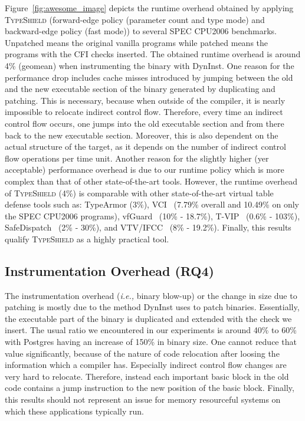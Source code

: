 Figure~\ref{fig:awesome_image} depicts the runtime overhead obtained by applying \textsc{TypeShield} (forward-edge policy (parameter count and type mode) and backward-edge policy (fast mode))
to several SPEC CPU2006 benchmarks. Unpatched means the original vanilla programs while patched means the programs with the CFI checks inserted.
The obtained runtime overhead is around 4\% (geomean) when instrumenting the binary with DynInst. 
One reason for the performance drop includes cache misses introduced by jumping between the old and the new executable section 
of the binary generated by duplicating and patching. This is necessary, because when
outside of the compiler, it is nearly impossible to relocate indirect control flow. Therefore, 
every time an indirect control flow occurs, one jumps into the old executable section and from 
there back to the new executable section. Moreover, this is also dependent on the actual structure 
of the target, as it depends on the number of indirect control flow operations per time unit.
Another reason for the slightly higher (yer acceptable) performance overhead is due to our
runtime policy which is more complex than that of other state-of-the-art tools.
However, the runtime overhead of \textsc{TypeShield} (4\%) is comparable with other state-of-the-art virtual table defense
tools such as: TypeArmor (3\%), VCI~\cite{vci:asiaccs} (7.79\% overall and 10.49\% on only the SPEC CPU2006 programs), vfGuard~\cite{vfuard:aravind} (10\% - 18.7\%), T-VIP~\cite{gawlik} (0.6\% - 103\%), 
SafeDispatch~\cite{safedispatch:jang} (2\% - 30\%), and VTV/IFCC~\cite{vtv:tice} (8\% - 19.2\%).
Finally, this results qualify \textsc{TypeShield} as a highly practical tool.


\subsection{Instrumentation Overhead (RQ4)}
\label{section:typeshieldoverheadinstrumentation}


The instrumentation overhead (\textit{i.e.,} binary blow-up) or the change in size due to patching is mostly due to the method DynInst uses to patch binaries. 
Essentially, the executable part of the binary is duplicated and extended with the check we insert. The usual ratio we encountered in our experiments is 
around 40\% to 60\% with Postgres having an increase of 150\% in binary size. One cannot reduce that 
value significantly, because of the nature of code relocation after loosing the information which a compiler has. Especially indirect control flow 
changes are very hard to relocate. Therefore, instead each important basic block in the old code contains a jump instruction to the new position of the basic block.
Finally, this results should not represent an issue for memory resourceful systems on which these applications typically run.

